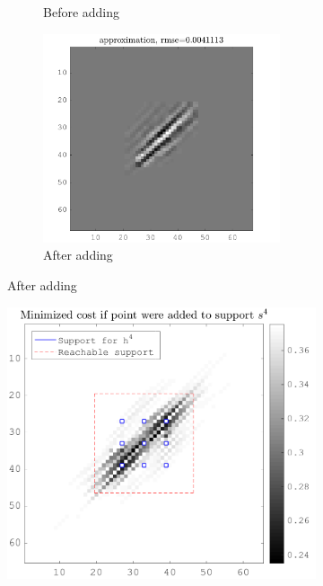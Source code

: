 \begin{figure}[!ht]
\begin{subfigure}[b]{0.99\textwidth}
\begin{subfigure}[b]{0.32\textwidth}
	\caption{Before adding}
	\end{subfigure}
	\begin{subfigure}[b]{0.32\textwidth}\centering
	\includegraphics[width=\textwidth]{figures/before_after/xp_128x128_sc2_angl1_K3_S3_node4after_approx.png}
	\caption{After adding}
	\end{subfigure}
\end{subfigure}
\begin{subfigure}[b]{0.32\textwidth}\centering
\includegraphics[width=\textwidth]{figures/before_after/xp_128x128_sc2_angl1_K3_S3_node4before_objmatrix.png}

\end{subfigure}
\end{figure}
